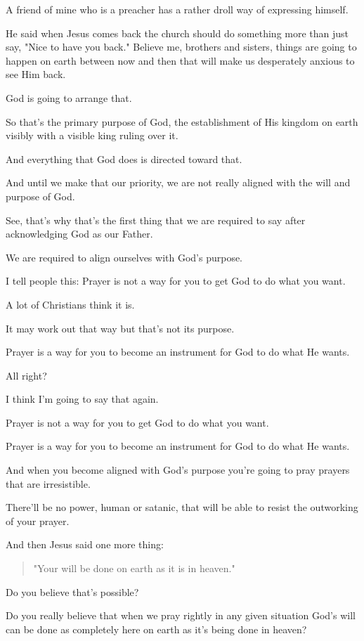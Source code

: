 \documentclass[11pt]{article}
\begin{document}
A friend of mine who is a preacher has a
rather droll way of expressing himself.

He said when Jesus comes back the church
should do something more than just say, "Nice
to have you back." Believe me, brothers and
sisters, things are going to happen on earth
between now and then that will make us
desperately anxious to see Him back.

God is going to arrange that.

So that's the primary purpose of God, the
establishment of His kingdom on earth visibly
with a visible king ruling over it.

And everything that God does is directed
toward that.

And until we make that our priority, we are
not really aligned with the will and purpose
of God.

See, that's why that's the first thing that we
are required to say after acknowledging God as
our Father.

We are required to align ourselves with God's
purpose.

I tell people this: Prayer is not a way for
you to get God to do what you want.

A lot of Christians think it is.

It may work out that way but that's not its
purpose.

Prayer is a way for you to become an
instrument for God to do what He wants.

All right?

I think I'm going to say that again.

Prayer is not a way for you to get God to do
what you want.

Prayer is a way for you to become an
instrument for God to do what He wants.

And when you become aligned with God's purpose
you're going to pray prayers that are
irresistible.

There'll be no power, human or satanic, that
will be able to resist the outworking of your
prayer.

And then Jesus said one more thing:

\begin{quote}
"Your will be done on earth as it is in heaven."
\end{quote}

Do you believe that's possible?

Do you really believe that when we pray
rightly in any given situation God's will can
be done as completely here on earth as it's
being done in heaven?
\end{document}
